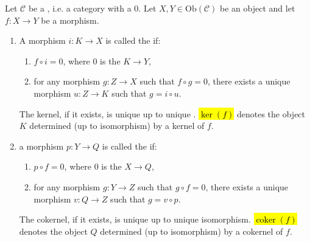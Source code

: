 \begin{definition} \label{definition:kernel_and_cokernel_of_a_morphism_in_a_pointed_category}
Let $\mathcal{C}$ be a  , i.e. a category with a  $0$. Let $X,Y \in \mathrm{Ob}(\mathcal{C})$ be an object and let $f: X \to Y$ be a morphism. 

\begin{enumerate}
    \item A morphism $i: K \to X$ is called the  if:
    \begin{enumerate}
        \item $f \circ i = 0$, where $0$ is the  $K \to Y$,
        \item for any morphism $g: Z \to X$ such that $f \circ g = 0$, there exists a unique morphism $u: Z \to K$ such that $g = i \circ u$.
    \end{enumerate}
    The kernel, if it exists, is unique up to unique . \hl{$\ker(f)$} denotes the object $K$ determined (up to isomorphism) by a kernel of $f$.


    \item a morphism $p: Y \to Q$ is called the  if:
    \begin{enumerate}
        \item $p \circ f = 0$, where $0$ is the  $X \to Q$,
        \item for any morphism $g: Y \to Z$ such that $g \circ f = 0$, there exists a unique morphism $v: Q \to Z$ such that $g = v \circ p$.
    \end{enumerate}
    The cokernel, if it exists, is unique up to unique isomorphism. \hl{$\operatorname{coker}(f)$} denotes the object $Q$ determined (up to isomorphism) by a cokernel of $f$.


\end{enumerate}

\end{definition}
